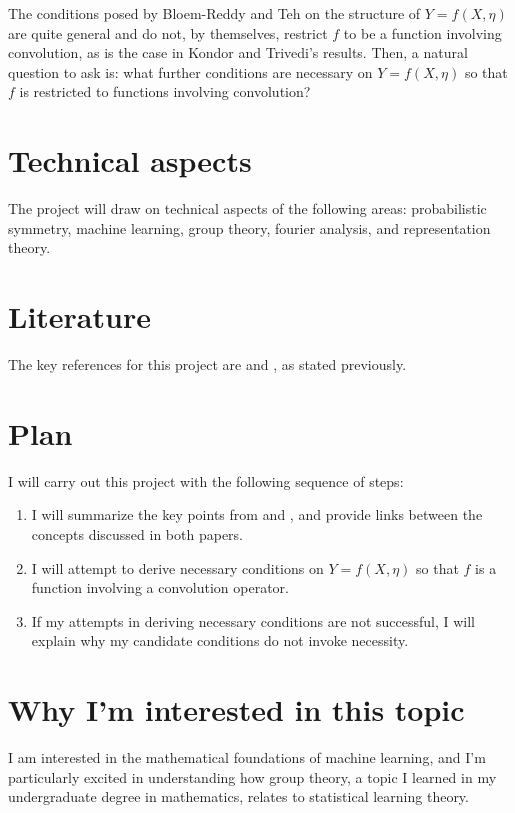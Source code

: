 \documentclass[]{STAT_547C}
\begin{document}
The conditions posed by Bloem-Reddy and Teh on the structure of $Y = f(X, \eta)$ are quite general and do not, by themselves, restrict $f$ to be a function involving convolution, as is the case in Kondor and Trivedi's results.
Then, a natural question to ask is: what further conditions are necessary on $Y = f(X, \eta)$ so that $f$ is restricted to functions involving convolution?
\section{Technical aspects}

The project will draw on technical aspects of the following areas: probabilistic symmetry, machine learning, group theory, fourier analysis, and representation theory.


\section{Literature}

The key references for this project are \cite{kondor2018generalization} and \cite{bloemreddy2019probabilistic}, as stated previously.


\section{Plan}

I will carry out this project with the following sequence of steps: 
\begin{enumerate}
  \item I will summarize the key points from \cite{bloemreddy2019probabilistic} and \cite{kondor2018generalization}, and provide links between the concepts discussed in both papers.
  \item I will attempt to derive necessary conditions on $Y = f(X, \eta)$ so that $f$ is a function involving a convolution operator. 
  \item If my attempts in deriving necessary conditions are not successful, I will explain why my candidate conditions do not invoke necessity.
\end{enumerate}


\section{Why I'm interested in this topic}

I am interested in the mathematical foundations of machine learning, and I'm particularly excited in understanding how group theory, a topic I learned in my undergraduate degree in mathematics, relates to statistical learning theory.


\printbibliography
\end{document}
